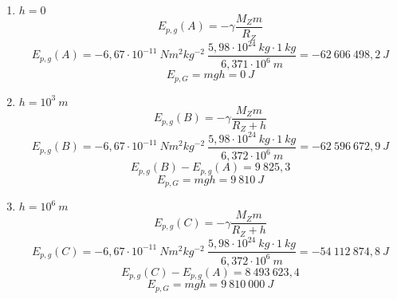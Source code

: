 
\begin{enumerate}[label=\alph*)]
 \item $h=0$
 $$ E_{p,g}(A) = -\gamma\frac{M_Zm}{R_Z}  $$
 $$  E_{p,g}(A) =- 6,67\cdot  10^{−11}\ Nm^2kg^{−2}\ \frac{5,98 \cdot  10^{24}\ kg\cdot 1 \ kg}{ 6,371 \cdot 10^6\ m}
 = - 62\ 606\ 498,2\ J$$
 $$E_{p,G}=mgh=0\ J $$
 \item $h=10^3\ m$
 $$ E_{p,g}(B) = -\gamma\frac{M_Zm}{R_Z+h}  $$
 $$  E_{p,g}(B) =- 6,67\cdot  10^{−11}\ Nm^2kg^{−2}\ \frac{5,98 \cdot  10^{24}\ kg\cdot 1 \ kg}{ 6,372 \cdot 10^6\ m}
 = - 62\ 596\ 672,9\ J$$
 $$ E_{p,g}(B)- E_{p,g}(A)=9\ 825,3 $$
 $$E_{p,G}=mgh=9\ 810\ J $$
 \item $h=10^6\ m$
 $$ E_{p,g}(C) = -\gamma\frac{M_Zm}{R_Z+h}  $$
 $$  E_{p,g}(C) =- 6,67\cdot  10^{−11}\ Nm^2kg^{−2}\ \frac{5,98 \cdot  10^{24}\ kg\cdot 1 \ kg}{ 6,372 \cdot 10^6\ m}
 = - 54\ 112\ 874,8\ J$$
 $$ E_{p,g}(C)- E_{p,g}(A)=8\ 493\ 623,4 $$
 $$E_{p,G}=mgh=9\ 810\ 000\ J $$
 
 
 
 
\end{enumerate}



